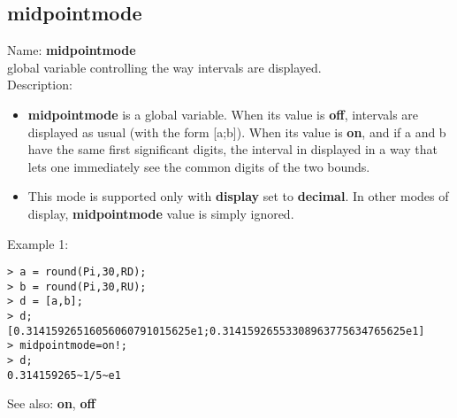 \subsection{ midpointmode }
\noindent Name: \textbf{midpointmode}\\
global variable controlling the way intervals are displayed.\\

\noindent Description: \begin{itemize}

\item \textbf{midpointmode} is a global variable. When its value is \textbf{off}, intervals are displayed
   as usual (with the form [a;b]).
   When its value is \textbf{on}, and if a and b have the same first significant digits,
   the interval in displayed in a way that lets one immediately see the common
   digits of the two bounds.

\item This mode is supported only with \textbf{display} set to \textbf{decimal}. In other modes of 
   display, \textbf{midpointmode} value is simply ignored.
\end{itemize}
\noindent Example 1: 
\begin{center}\begin{minipage}{15cm}\begin{Verbatim}[frame=single]
> a = round(Pi,30,RD);
> b = round(Pi,30,RU);
> d = [a,b];
> d;
[0.31415926516056060791015625e1;0.31415926553308963775634765625e1]
> midpointmode=on!;
> d;
0.314159265~1/5~e1
\end{Verbatim}
\end{minipage}\end{center}
See also: \textbf{on}, \textbf{off}
